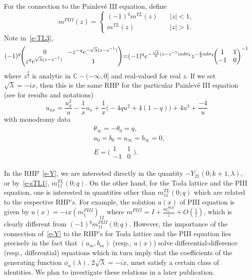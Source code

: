 \documentclass{amsart}
\theoremstyle{definition}
\theoremstyle{remark}
\numberwithin{equation}{section}
\newcommand{\C}{\mathbb C}
\begin{document}
For the connection to the Painlev\'e III equation, 
define 
\begin{equation}
  m^{PIII}(z)=
  \begin{cases}
     (-1)^qm^{TL}(z) &\quad |z|<1,\\
     m^{TL}(z) &\quad |z|>1.
  \end{cases}
\end{equation}
Note in~\eqref{e-TL3}, 
\begin{equation}
   (-1)^q\negthickspace\begin{pmatrix}
0\negthickspace&\negthickspace-z^{-q}e^{-\sqrt{\lambda}(z-z^{-1})}\\
z^{q}e^{\sqrt{\lambda}(z-z^{-1})}&1 \end{pmatrix}\negthickspace
= \negthickspace(-1)^qe^{-\frac{\sqrt{\lambda}}2(z-z^{-1})ad\sigma_3}z^{-\frac{q}2ad\sigma_3}  
\negthickspace\begin{pmatrix} 1&1\\-1&0 \end{pmatrix} ^{-1}
\end{equation}
where $z^{\frac{q}2}$ is analytic in 
$\C-(-\infty,0]$ and real-valued for real $z$.
If we set $\sqrt{\lambda}=-ix$, then
this is the same RHP for the particular  
Painlev\'e III equation (see \cite{FMZ} for results and notations)
\begin{equation*}
   u_{xx}=\frac{u_x^2}{u}-\frac1{x}u_x
+\frac1{x}\bigl( -4qu^2+4(1-q)\bigr) +4u^3+\frac{-4}{u}
\end{equation*}
with monodromy data 
\begin{equation*}
  \begin{split}
    &\theta_{\infty}=-\theta_0=q,\\
    &a_0=b_0=a_{\infty}=b_{\infty}=0,\\
    &E=\bigl( \begin{smallmatrix} 1&1\\-1&0 \end{smallmatrix} \bigr).
  \end{split}
\end{equation*}

In the RHP~\eqref{e-Y}, we are interested directly in the quantity 
$-Y_{21}(0;k+1,\lambda)$, or by~\eqref{e-sTL1}, $m^{TL}_{11}(0;q)$. 
On the other hand, for the Toda lattice and the PIII equation, one is 
interested in quantities other than $m^{TL}_{11}(0;q)$ which are 
related to the respective RHP's. 
For example, the solution $u(x)$ of PIII equation is given by 
$u(x)=-ix(m^{PIII}_1)_{12}$ where $m^{PIII}=I+\frac{m^{PIII}_1}{z}
+O(\frac1{z})$, which is clearly different from $(-1)^qm^{PIII}_{11}(0;q)$.
However, the importance of the connection of~\eqref{e-Y} to the RHP's 
for Toda lattice and the PIII equation lies precisely in the fact that 
$(a_m,b_m)$ (resp., $u(x)$) solve differential-difference 
(resp., differential) equations which in turn imply that the coefficients  
of the generating function $\phi_n(\lambda)$, $2\sqrt{\lambda}=-ix$, 
must satisfy a certain class of identities. 
We plan to investigate these relations in a later publication.
\end{document}
